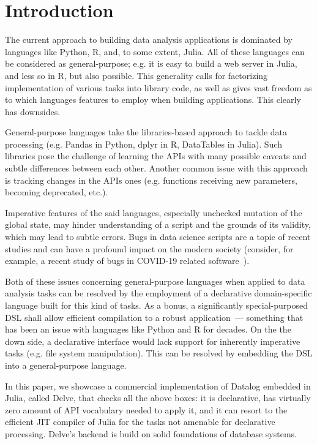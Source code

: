 \section{Introduction}

The current approach to building data analysis applications is 
dominated by languages like Python, R, and, to some extent, Julia.
All of these languages can be considered as general-purpose; e.g. it is easy
to build a web server in Julia, and less so in R, but also possible.
This generality calls for factorizing implementation of various tasks into 
library code, as well as gives vast freedom as to which languages
features to employ when building applications. This clearly has downsides.

General-purpose languages take the libraries-based approach to tackle 
data processing (e.g. Pandas in Python, dplyr in R, DataTables in Julia).
Such libraries pose the challenge of learning the APIs with many possible 
caveats and subtle differences between each other.
Another common issue with this approach is tracking changes in
the APIs ones (e.g. functions receiving new parameters, becoming deprecated,
etc.). 

Imperative features of the said languages, especially unchecked mutation
of the global state, may hinder understanding of a script and the grounds
of its validity, which may lead to subtle errors. Bugs in data science 
scripts are a topic of recent studies and can have a profound impact on
the modern society (consider, for example, a recent study of bugs in COVID-19
related software~\cite{bugscovid}).

Both of these issues concerning general-purpose languages when applied to
data analysis tasks can be resolved by the employment of a declarative 
domain-specific language built for this kind of tasks.
As a bonus, a significantly special-purposed DSL shall
allow efficient compilation to a robust application~--- something that
has been an issue with languages like Python and R for decades. 
On the the down side, a declarative interface would lack support
for inherently imperative tasks (e.g. file system manipulation).
This can be resolved by embedding the DSL into a general-purpose 
language.

In this paper, we showcase a commercial implementation of Datalog
embedded in Julia, called Delve, that checks all the above boxes: it is declarative,
has virtually zero amount of API vocabulary needed to apply it,
and it can resort to the efficient JIT compiler of Julia for the tasks
not amenable for declarative processing. Delve's backend is build on solid 
foundations of database systems.

